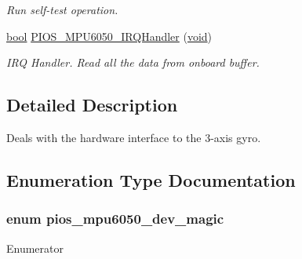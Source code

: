 \begin{DoxyCompactItemize}
\begin{DoxyCompactList}\small\item\em Run self-\/test operation. \end{DoxyCompactList}\item 
\hyperlink{group___exported__types_gaf6a258d8f3ee5206d682d799316314b1}{bool} \hyperlink{group___p_i_o_s___m_p_u6050_ga57a952ab33508817d11a1ea755d17325}{P\-I\-O\-S\-\_\-\-M\-P\-U6050\-\_\-\-I\-R\-Q\-Handler} (\hyperlink{group___n_a_m_e_ga18028b8badbf1ea7e704ccac3c488e82}{void})
\begin{DoxyCompactList}\small\item\em I\-R\-Q Handler. Read all the data from onboard buffer. \end{DoxyCompactList}\end{DoxyCompactItemize}


\subsection{Detailed Description}
Deals with the hardware interface to the 3-\/axis gyro. 

\subsection{Enumeration Type Documentation}
\hypertarget{group___p_i_o_s___m_p_u6050_ga22a9ad4120542ed164b6afe9b094b6f3}{
\subsubsection[{pios\-\_\-mpu6050\-\_\-dev\-\_\-magic}]{\setlength{\rightskip}{0pt plus 5cm}enum {\bf pios\-\_\-mpu6050\-\_\-dev\-\_\-magic}}}\label{group___p_i_o_s___m_p_u6050_ga22a9ad4120542ed164b6afe9b094b6f3}
\begin{Desc}
\item[Enumerator]\par
\begin{description}
\item[{\em 
\hypertarget{group___p_i_o_s___m_p_u6050_gga22a9ad4120542ed164b6afe9b094b6f3ab2ce219069f414a9b51976c869c1c3b6}{P\-I\-O\-S\-\_\-\-M\-P\-U6050\-\_\-\-D\-E\-V\-\_\-\-M\-A\-G\-I\-C}\label{group___p_i_o_s___m_p_u6050_gga22a9ad4120542ed164b6afe9b094b6f3ab2ce219069f414a9b51976c869c1c3b6}
}]\end{description}
\end{Desc}


